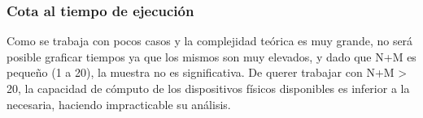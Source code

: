  \subsubsection*{Cota al tiempo de ejecución}

Como se trabaja con pocos casos y la complejidad te\'orica es muy grande, no ser\'a posible graficar tiempos ya que los mismos son muy elevados, y dado que N+M es pequeño (1 a 20), la muestra no es significativa. De querer trabajar con N+M > 20, la capacidad de cómputo de los dispositivos físicos disponibles es inferior a la necesaria, haciendo impracticable su análisis.



